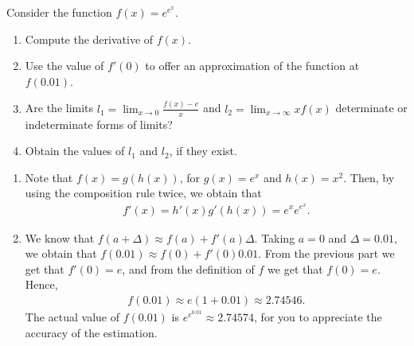 \documentclass[11pt]{exam}
\begin{document}
\begin{questions}
\begin{solution}[0cm]
\begin{enumerate}[leftmargin = 0.5cm, label = (\alph*), rightmargin = 0.2cm]
    \end{enumerate}
\end{solution}

\question[3]
    Consider the function $f(x) = e^{e^{x}}$.

    \begin{enumerate}[leftmargin = 0.5cm, label = (\alph*), rightmargin = 0.2cm]
        
        \item Compute the derivative of $f(x)$.

        \item Use the value of $f'(0)$ to offer an approximation of the function at $f(0.01)$.

        \item Are the limits $l_1 = \lim_{x\rightarrow 0} \frac{f(x) - e}{x}$ and $l_ 2 = \lim_{x \rightarrow\infty} xf(x)$ determinate or indeterminate forms of limits?

        \item Obtain the values of $l_1$ and $l_2$, if they exist.
        
    \end{enumerate}
    
\begin{solution}[0cm]
    
    \begin{enumerate}[leftmargin = 0.5cm, label = (\alph*), rightmargin = 0.2cm]
        
        \item Note that $f(x) = g(h(x))$, for $g(x) = e^x$ and $h(x) = x^2$. Then, by using the composition rule twice, we obtain that
            \begin{align*}
                f'(x) = h'(x)g'(h(x)) = e^{x}e^{e^{x}}.    
            \end{align*}
            
        \item We know that $f(a + \Delta) \approx f(a) + f'(a)\Delta$. Taking $a = 0$ and $\Delta = 0.01$, we obtain that $f(0.01) \approx f(0) + f'(0)0.01$. From the previous part we get that $f'(0) = e$, and from the definition of $f$ we get that $f(0) = e$. Hence,
        \begin{align*}
            f(0.01) \approx e(1 + 0.01) \approx 2.74546.
        \end{align*}
        The actual value of $f(0.01)$ is $e^{e^{0.01}} \approx 2.74574$, for you to appreciate the accuracy of the estimation.


\end{enumerate}
\end{solution}
\end{questions}
\end{document}
